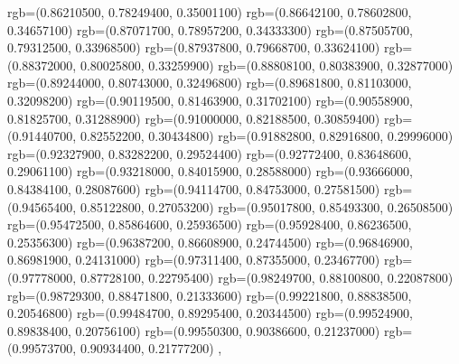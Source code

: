 {{{      rgb=(0.86210500, 0.78249400, 0.35001100)
      rgb=(0.86642100, 0.78602800, 0.34657100)
      rgb=(0.87071700, 0.78957200, 0.34333300)
      rgb=(0.87505700, 0.79312500, 0.33968500)
      rgb=(0.87937800, 0.79668700, 0.33624100)
      rgb=(0.88372000, 0.80025800, 0.33259900)
      rgb=(0.88808100, 0.80383900, 0.32877000)
      rgb=(0.89244000, 0.80743000, 0.32496800)
      rgb=(0.89681800, 0.81103000, 0.32098200)
      rgb=(0.90119500, 0.81463900, 0.31702100)
      rgb=(0.90558900, 0.81825700, 0.31288900)
      rgb=(0.91000000, 0.82188500, 0.30859400)
      rgb=(0.91440700, 0.82552200, 0.30434800)
      rgb=(0.91882800, 0.82916800, 0.29996000)
      rgb=(0.92327900, 0.83282200, 0.29524400)
      rgb=(0.92772400, 0.83648600, 0.29061100)
      rgb=(0.93218000, 0.84015900, 0.28588000)
      rgb=(0.93666000, 0.84384100, 0.28087600)
      rgb=(0.94114700, 0.84753000, 0.27581500)
      rgb=(0.94565400, 0.85122800, 0.27053200)
      rgb=(0.95017800, 0.85493300, 0.26508500)
      rgb=(0.95472500, 0.85864600, 0.25936500)
      rgb=(0.95928400, 0.86236500, 0.25356300)
      rgb=(0.96387200, 0.86608900, 0.24744500)
      rgb=(0.96846900, 0.86981900, 0.24131000)
      rgb=(0.97311400, 0.87355000, 0.23467700)
      rgb=(0.97778000, 0.87728100, 0.22795400)
      rgb=(0.98249700, 0.88100800, 0.22087800)
      rgb=(0.98729300, 0.88471800, 0.21333600)
      rgb=(0.99221800, 0.88838500, 0.20546800)
      rgb=(0.99484700, 0.89295400, 0.20344500)
      rgb=(0.99524900, 0.89838400, 0.20756100)
      rgb=(0.99550300, 0.90386600, 0.21237000)
      rgb=(0.99573700, 0.90934400, 0.21777200)
   },
}}

